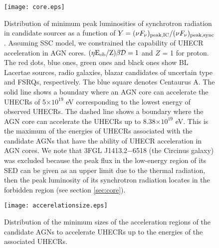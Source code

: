 \documentclass{aastex6}
\begin{document}
\begin{figure}[h]
 \centering
  \texttt{[image: core.eps]}
  \caption{Distribution of minimum peak luminosities of synchrotron radiation in candidate sources as a function of $Y = (\nu F_{\nu})_{\rm{peak,IC}}/(\nu F_{\nu})_{\rm{peak,sync}}$. Assuming SSC model, we constrained the capability of UHECR acceleration in AGN cores. $(\eta \rm E_{\rm ob}/{\rm Z})\beta \cal{D}\rm = 1$ and $Z$ = 1 for proton. The red dots, blue ones, green ones and black ones show BL Lacertae sources, radio galaxies, blazar candidates of uncertain type and FSRQs, respectively. The blue square denotes Centaurus A.
The solid line shows a boundary where an AGN core can accelerate the UHECRs of 5$\times10^{19}$ eV corresponding to the lowest energy of observed UHECRs.
The dashed line shows a boundary where the AGN core can accelerate the UHECRs up to 8.38$\times10^{19}$ eV.
This is the maximum of the energies of UHECRs associated with the candidate AGNs that have the ability of UHECR acceleration in AGN cores.
We note that 3FGL J1413.2$-$6518 (the Circinus galaxy) was excluded because the peak flux in the low-energy region of its SED can be given as an upper limit due to the thermal radiation, then the peak luminosity of its synchrotron radiation locates in the forbidden region (see section \ref{sec:core}).
}
  \label{fig:PLcore}
\end{figure}

\begin{figure}[h]
 \centering
  \texttt{[image: accerelationsize.eps]}
  \caption{Distribution of the minimum sizes of the acceleration regions of the candidate AGNs to accelerate UHECRs up to the energies of the associated UHECRs.}
  \label{fig:PLlobe}
\end{figure}
\end{document}
